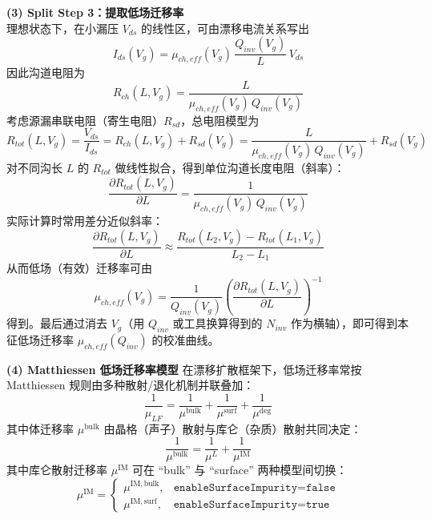 \documentclass[12pt, a4paper, UTF8]{article}
\begin{document}
\noindent\textbf{(3) Split Step 3：提取低场迁移率}
\\理想状态下，在小漏压 $V_{ds}$ 的线性区，可由漂移电流关系写出
\begin{equation}
I_{ds}(V_g)=\mu_{ch,eff}(V_g)\,\frac{Q_{inv}(V_g)}{L}\,V_{ds}
\end{equation}
因此沟道电阻为
\begin{equation}
R_{ch}(L,V_g)=\frac{L}{\mu_{ch,eff}(V_g)\,Q_{inv}(V_g)}
\end{equation}
考虑源漏串联电阻（寄生电阻）$R_{sd}$，总电阻模型为
\begin{equation}
R_{tot}(L,V_g)=\frac{V_{ds}}{I_{ds}}=R_{ch}(L,V_g)+R_{sd}(V_g)=\frac{L}{\mu_{ch,eff}(V_g)\,Q_{inv}(V_g)}+R_{sd}(V_g)
\end{equation}
对不同沟长 $L$ 的 $R_{tot}$ 做线性拟合，得到单位沟道长度电阻（斜率）：
\begin{equation}
\frac{\partial R_{tot}(L,V_g)}{\partial L}=\frac{1}{\mu_{ch,eff}(V_g)\,Q_{inv}(V_g)}
\end{equation}
实际计算时常用差分近似斜率：
\begin{equation}
\frac{\partial R_{tot}(L,V_g)}{\partial L}\approx \frac{R_{tot}(L_2,V_g)-R_{tot}(L_1,V_g)}{L_2-L_1}
\end{equation}
从而低场（有效）迁移率可由
\begin{equation}
\mu_{ch,eff}(V_g)=\frac{1}{Q_{inv}(V_g)}\left(\frac{\partial R_{tot}(L,V_g)}{\partial L}\right)^{-1}
\end{equation}
得到。最后通过消去 $V_g$（用 $Q_{inv}$ 或工具换算得到的 $N_{inv}$ 作为横轴），即可得到本征低场迁移率 $\mu_{ch,eff}(Q_{inv})$ 的校准曲线。

\noindent\textbf{(4) Matthiessen 低场迁移率模型}
在漂移扩散框架下，低场迁移率常按 Matthiessen 规则由多种散射/退化机制并联叠加：
\begin{equation}
\frac{1}{\mu_{LF}}=\frac{1}{\mu^{\mathrm{bulk}}}+\frac{1}{\mu^{\mathrm{surf}}}+\frac{1}{\mu^{\mathrm{deg}}}
\end{equation}
其中体迁移率 $\mu^{\mathrm{bulk}}$ 由晶格（声子）散射与库仑（杂质）散射共同决定：
\begin{equation}
\frac{1}{\mu^{\mathrm{bulk}}}=\frac{1}{\mu^{L}}+\frac{1}{\mu^{\mathrm{IM}}}
\end{equation}
其中库仑散射迁移率 $\mu^{\mathrm{IM}}$ 可在 ``bulk'' 与 ``surface'' 两种模型间切换：
\begin{equation}
\mu^{\mathrm{IM}}=
\begin{cases}
\mu^{\mathrm{IM,bulk}}, & \texttt{enableSurfaceImpurity}=\texttt{false}\\
\mu^{\mathrm{IM,surf}}, & \texttt{enableSurfaceImpurity}=\texttt{true}
\end{cases}
\end{equation}
\end{document}
